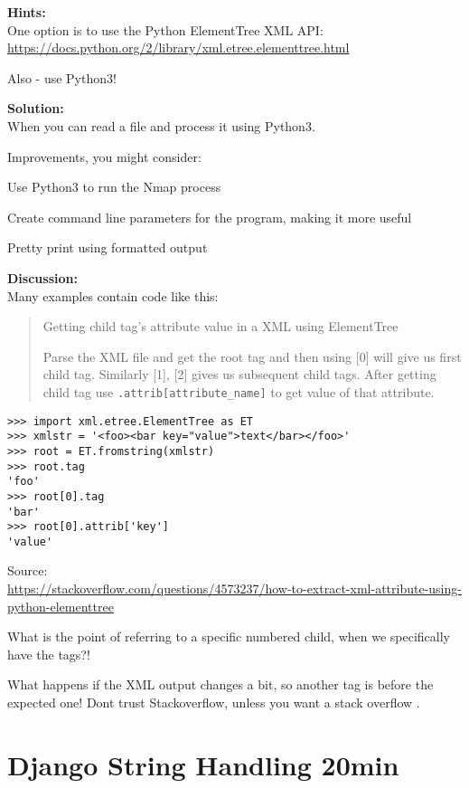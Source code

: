 \documentclass[a4paper,11pt,notitlepage]{report}
\begin{document}
{\bf Hints:}\\
One option is to use the Python ElementTree XML API:\\
\url{https://docs.python.org/2/library/xml.etree.elementtree.html}

Also - use Python3!

{\bf Solution:}\\
When you can read a file and process it using Python3.

Improvements, you might consider:
\begin{list2}
\item Use Python3 to run the Nmap process
\item Create command line parameters for the program, making it more useful
\item Pretty print using formatted output
\end{list2}
{\bf Discussion:}\\
Many examples contain code like this:

\begin{quote}
Getting child tag's attribute value in a XML using ElementTree

Parse the XML file and get the root tag and then using [0] will give us first child tag. Similarly [1], [2] gives us subsequent child tags. After getting child tag use \verb+.attrib[attribute_name]+ to get value of that attribute.
\end{quote}
\begin{verbatim}
>>> import xml.etree.ElementTree as ET
>>> xmlstr = '<foo><bar key="value">text</bar></foo>'
>>> root = ET.fromstring(xmlstr)
>>> root.tag
'foo'
>>> root[0].tag
'bar'
>>> root[0].attrib['key']
'value'
\end{verbatim}
Source:\\{\footnotesize \url{https://stackoverflow.com/questions/4573237/how-to-extract-xml-attribute-using-python-elementtree}}

What is the point of referring to a specific numbered child, when we specifically have the tags?!

What happens if the XML output changes a bit, so another tag is before the expected one! Dont trust Stackoverflow, unless you want a stack overflow \smiley.


\chapter{Django String Handling 20min}
\label{ex:django-string}
\end{document}
